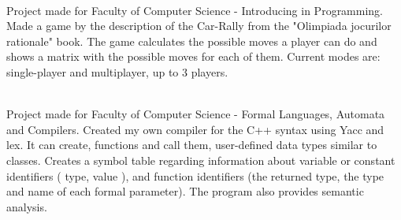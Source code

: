 \documentclass[a4paper]{MagicalCV}
\begin{document}
\begin{minipage}[t]{0.59\textwidth}

 \\
Project made for Faculty of Computer Science - Introducing in Programming. Made a game by the description of the Car-Rally from the "Olimpiada jocurilor rationale" book. The game calculates the possible moves a player can do and shows a matrix with the possible moves for each of them. Current modes are: single-player and multiplayer, up to 3 players.
\sectionsep

 \\
Project made for Faculty of Computer Science - Formal Languages, Automata and Compilers.
Created my own compiler for the C++ syntax using Yacc and lex. It can create, functions and call them, user-defined data types similar to classes. Creates a symbol table regarding information about variable or constant identifiers ( type, value ), and function identifiers (the returned type, the type and name of each formal parameter).  The program also provides semantic analysis.
\sectionsep

\end{minipage} 
\end{document}
